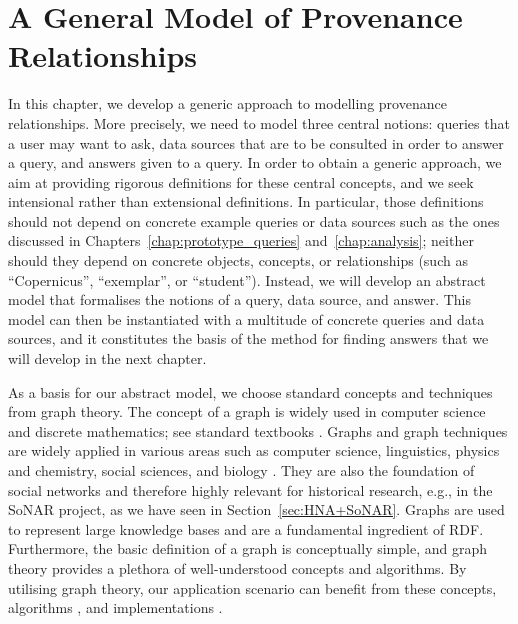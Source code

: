 \chapter{A General Model of Provenance Relationships}
\label{chap:modelling}

In this chapter, we develop a generic approach to modelling provenance relationships.
More precisely, we need to model three central notions: queries that a user may want to ask,
data sources that are to be consulted in order to answer a query,
and answers given to a query.
In order to obtain a generic approach, we aim at providing rigorous definitions
for these central concepts, and we seek intensional rather than extensional definitions.
In particular, those definitions should not depend on concrete example queries or data sources
such as the ones discussed in Chapters~\ref{chap:prototype_queries} and~\ref{chap:analysis};
neither should they depend on concrete objects, concepts, or relationships
(such as \enquote{Copernicus}, \enquote{exemplar}, or \enquote{student}).
Instead, we will develop an abstract model that formalises
the notions of a query, data source, and answer.
This model can then be instantiated with a multitude of concrete queries and data sources,
and it constitutes the basis of the method for finding answers
that we will develop in the next chapter.

As a basis for our abstract model, we choose standard concepts and techniques
from graph theory.
The concept of a graph is widely used in computer science and discrete mathematics;
see standard textbooks \autocite[e.g.,][]{Diestel2012}.
Graphs and graph techniques are widely applied in various areas such as 
computer science, linguistics, physics and chemistry,
social sciences, and biology \autocite{WikiGraphTheoryApplications}.
They are also the foundation of social networks \autocite{Galety2022}
and therefore highly relevant for historical research, e.g.,
in the \gls{SoNAR} project, as we have seen in Section~\ref{sec:HNA+SoNAR}.
Graphs
are used to represent large knowledge bases \autocite[e.g.,][]{Ehrlinger2016}
and are a fundamental ingredient of \gls{RDF}.
Furthermore, the basic definition of a graph is conceptually simple,
and graph theory provides a plethora of well-understood concepts
and algorithms. By utilising graph theory, our application scenario
can benefit from these concepts, algorithms \autocite{Diestel2012,Even2012},
and implementations \autocite{PythonGraphLibraries,JGraphT}.

